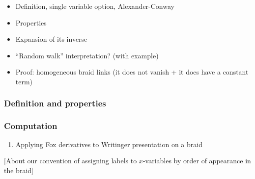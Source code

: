 \documentclass[11pt,e-only]{amsart}
\begin{document}
\begin{itemize}
    \item Definition, single variable option, Alexander-Conway
    \item Properties
    \item Expansion of its inverse
    \item ``Random walk'' interpretation? (with example)
    \item Proof: homogeneous braid links (it does not vanish + it does have a constant term)
\end{itemize}


\subsubsection{Definition and properties}



\subsubsection{Computation}

\begin{enumerate}
    \item Applying Fox derivatives to Writinger presentation on a braid
\end{enumerate}

[About our convention of assigning labels to $x$-variables by order of appearance in the braid]
\end{document}
